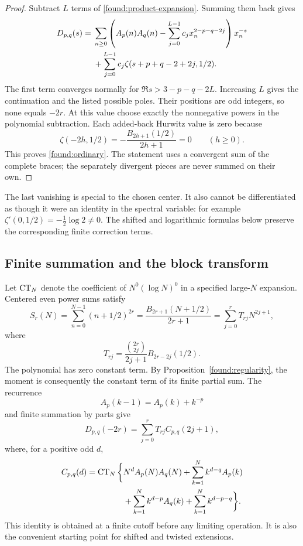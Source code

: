 \begin{proof}
Subtract $L$ terms of \eqref{found:product-expansion}. Summing them
back gives
\begin{align}\label{found:continuation}
 D_{p,q}(s)={}&\sum_{n\ge0}
 \left(A_p(n)A_q(n)-\sum_{j=0}^{L-1}c_jx_n^{2-p-q-2j}\right)x_n^{-s}
 \notag\\
 &+\sum_{j=0}^{L-1}c_j\zeta(s+p+q-2+2j,1/2).
\end{align}
The first term converges normally for
$\Re s>3-p-q-2L$. Increasing $L$ gives the continuation and the
listed possible poles. Their positions are odd integers, so none
equals $-2r$. At this value choose exactly the nonnegative powers
in the polynomial subtraction. Each added-back Hurwitz value is
zero because
\[
 \zeta(-2h,1/2)=-\frac{B_{2h+1}(1/2)}{2h+1}=0
 \qquad(h\ge0).
\]
This proves \eqref{found:ordinary}. The statement uses a convergent
sum of the complete braces; the separately divergent pieces are
never summed on their own.
\end{proof}

The last vanishing is special to the chosen center. It also cannot
be differentiated as though it were an identity in the spectral
variable: for example $\zeta'(0,1/2)=-\tfrac12\log2\ne0$.
The shifted and logarithmic formulas below preserve the corresponding
finite correction terms.

\subsection{Finite summation and the block transform}

Let $\operatorname{CT}_N$ denote the coefficient of $N^0(\log N)^0$ in a
specified large-$N$ expansion. Centered even power sums satisfy
\begin{equation}\label{found:power-sum}
 S_r(N)=\sum_{n=0}^{N-1}(n+1/2)^{2r}
 =\frac{B_{2r+1}(N+1/2)}{2r+1}
 =\sum_{j=0}^r T_{rj}N^{2j+1},
\end{equation}
where
\[
 T_{rj}=\frac{\binom{2r}{2j}}{2j+1}B_{2r-2j}(1/2).
\]
The polynomial has zero constant term. By
Proposition~\ref{found:regularity}, the moment is consequently the
constant term of its finite partial sum. The recurrence
\[
                         A_p(k-1)=A_p(k)+k^{-p}
\]
and finite summation by parts give
\begin{equation}\label{found:blocks}
 D_{p,q}(-2r)=\sum_{j=0}^r T_{rj}C_{p,q}(2j+1),
\end{equation}
where, for a positive odd $d$,
\begin{align}\label{found:block-CT}
 C_{p,q}(d)=\operatorname{CT}_N\bigg\{&N^dA_p(N)A_q(N)
       +\sum_{k=1}^N k^{d-q}A_p(k)\notag\\
       &+\sum_{k=1}^N k^{d-p}A_q(k)
       +\sum_{k=1}^N k^{d-p-q}\bigg\}.
\end{align}
This identity is obtained at a finite cutoff before any limiting
operation. It is also the convenient starting point for shifted and
twisted extensions.

